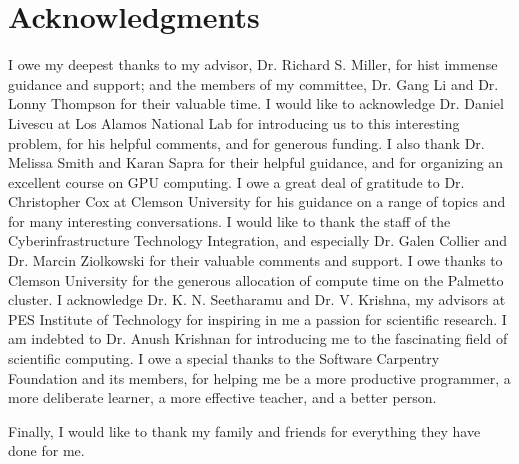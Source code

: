 \chapter*{Acknowledgments}

I owe my deepest thanks
to my advisor, Dr. Richard S. Miller,
for hist immense guidance and support;
and the members of my committee,
Dr. Gang Li and Dr. Lonny Thompson
for their valuable time.
I would like to acknowledge
Dr. Daniel Livescu at Los Alamos National Lab
for introducing us to this interesting problem,
for his helpful comments,
and for generous funding.
I also thank
Dr. Melissa Smith and Karan Sapra
for their helpful guidance,
and for organizing an excellent course on GPU computing.
I owe a great deal of gratitude to
Dr. Christopher Cox at Clemson University
for his guidance on a range of topics
and for many interesting conversations.
I would like to thank the
staff of the Cyberinfrastructure Technology Integration,
and especially
Dr. Galen Collier and Dr. Marcin Ziolkowski
for their valuable comments and support.
I owe thanks to Clemson University for the generous
allocation of compute time on the Palmetto cluster.
I acknowledge
Dr. K. N. Seetharamu and Dr. V. Krishna,
my advisors at PES Institute of Technology
for inspiring in me a passion for
scientific research.
I am indebted to Dr. Anush Krishnan
for introducing me to the fascinating field of
scientific computing.
I owe a special thanks to the
Software Carpentry Foundation
and its members,
for helping me be
a more productive programmer,
a more deliberate learner,
a more effective teacher,
and a better person.

Finally,
I would like to thank my family and friends
for everything they have done for me.
